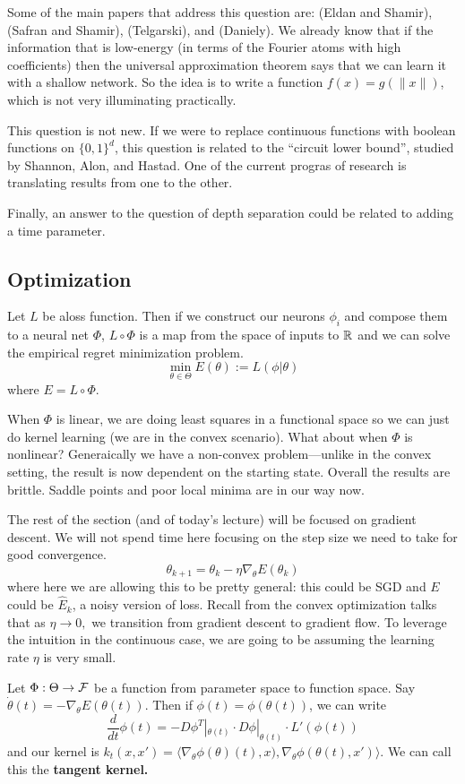 \documentclass[12pt]{article}
\begin{document}
Some of the main papers that address this question are: (Eldan and Shamir), (Safran and Shamir), (Telgarski), and (Daniely). We already know that if the information that is low-energy (in terms of the Fourier atoms with high coefficients) then 
the universal approximation theorem says that we can learn it with a shallow network. So the idea is to write a function $f(x)=g(\|x\|)$, which is not very illuminating practically.

This question is not new. If we were to replace continuous functions with boolean functions on $\{0,1\}^d$, this question is related to the ``circuit lower bound'', 
studied by Shannon, Alon, and Hastad. One of the current progras of research is translating results from one to the other.

Finally, an answer to the question of depth separation could be related to adding a time parameter.

\subsection{Optimization}
Let $L$ be aloss function. Then if we construct our neurons $\phi_i$ and compose them to a neural net $\Phi$, $L\circ\Phi$ is a map from the space of inputs to $\mathbb{R}$ and we can solve the empirical regret minimization problem.
\[\min_{\theta\in\Theta}E(\theta):=L(\phi|\theta)\]
where $E=L\circ \Phi$.

When $\Phi$ is linear, we are doing least squares in a functional space so we can just do kernel learning (we are in the convex scenario). What about when $\Phi$ is nonlinear? Generaically we have a non-convex problem---unlike in the convex setting, the result is now dependent on the starting state. Overall the results are brittle. Saddle points and poor local minima are in our way now.

The rest of the section (and of today's lecture) will be focused on gradient descent. We will not spend time here focusing on the step size we need to take for good convergence. 
\[\theta_{k+1}=\theta_k-\eta\nabla_\theta E(\theta_k)\]
where here we are allowing this to be pretty general: this could be SGD and $E$ could be $\hat E_k$, a noisy version of loss. Recall from the convex optimization talks that as $\eta\to 0,$ we transition from gradient descent to gradient flow. To leverage the intuition in the continuous case, we are going to be assuming the learning rate $\eta$ is very small.

Let $\Phi:\Theta\to \mathcal{F}$ be a function from parameter space to function space. Say $\dot \theta(t)=-\nabla_\theta E(\theta(t))$. Then if $\phi(t)= \phi(\theta(t))$, we can write 
\[\frac{d}{dt} \phi(t)=-D\phi^T|_{\theta(t)}\cdot D\phi|_{\theta(t)}\cdot L'(\phi(t))\]
and our kernel is $k_t(x,x')=\langle\nabla_\theta\phi(\theta)(t),x),\nabla_\theta \phi(\theta(t),x')\rangle$. We can call this the \textbf{tangent kernel.}
\end{document}

